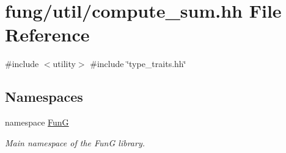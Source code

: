 \hypertarget{compute__sum_8hh}{\section{fung/util/compute\-\_\-sum.hh \-File \-Reference}
\label{compute__sum_8hh}
}
{\ttfamily \#include $<$utility$>$}\*
{\ttfamily \#include \char`\"{}type\-\_\-traits.\-hh\char`\"{}}\*
\subsection*{\-Namespaces}
\begin{DoxyCompactItemize}
\item 
namespace \hyperlink{namespaceFunG}{\-Fun\-G}
\begin{DoxyCompactList}\small\item\em \-Main namespace of the \-Fun\-G library. \end{DoxyCompactList}\end{DoxyCompactItemize}
